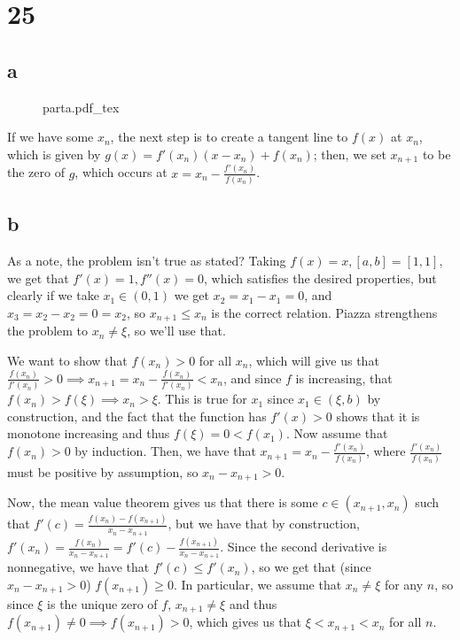 \documentclass[12pt,letterpaper]{article}
\theoremstyle{definition}
\newcommand{\incfig}[1] {%
    {#1.pdf_tex}
}
\begin{document}
\section*{25}


\subsection*{a}

\begin{figure}[H]
  \centering
  \incfig{parta}
\end{figure}

If we have some $x_{n}$, the next step is to create a tangent line to $f(x)$ at $x_{n}$, which is given by $g(x) = f'(x_{n})(x - x_{n}) + f(x_{n})$; then, we set $x_{n+1}$ to be the zero of $g$, which occurs at $x = x_{n} - \frac{f'(x_{n})}{f(x_{n})}$.

\subsection*{b}

As a note, the problem isn't true as stated? Taking $f(x) = x, [a,b] = [1,1]$, we get that $f'(x) = 1, f''(x) = 0$, which satisfies the desired properties, but clearly if we take $x_{1} \in (0, 1)$ we get $x_{2} = x_{1} - x_{1} = 0$, and $x_{3} = x_{2} - x_{2} = 0 = x_{2}$, so $x_{n+1} \leq x_{n}$ is the correct relation. Piazza strengthens the problem to $x_{n} \neq \xi$, so we'll use that.

We want to show that $f(x_{n}) > 0$ for all $x_{n}$, which
will give us that $\frac{f(x_{n})}{f'(x_{n})} > 0 \implies x_{n+1} = x_{n} - \frac{f(x_{n})}{f'(x_{n})} < x_{n}$, and since $f$ is increasing, that $f(x_{n}) > f(\xi) \implies x_{n} > \xi$. This is true for $x_{1}$ since $x_{1} \in (\xi, b)$ by construction, and the fact that the function has $f'(x) > 0$ shows that it is monotone increasing and thus $f(\xi) = 0 < f(x_{1})$. Now assume that $f(x_{n}) > 0$ by induction. Then, we have that $x_{n+1} = x_{n} - \frac{f'(x_{n})}{f(x_{n})}$, where $\frac{f'(x_{n})}{f(x_{n})}$ must be positive by assumption, so $x_{n} - x_{n+1} > 0$.

Now, the mean value theorem gives us that there is some $c \in (x_{n+1}, x_{n})$ such that $f'(c) = \frac{f(x_{n}) - f(x_{n+1})}{x_{n} - x_{n+1}}$, but we have that by construction, $f'(x_{n}) = \frac{f(x_{n})}{x_{n} - x_{n+1}} = f'(c) - \frac{f(x_{n+1})}{x_{n} - x_{n+1}}$. Since the second derivative is nonnegative, we have that $f'(c) \leq f'(x_{n})$, so we get that (since $x_{n} - x_{n+1} > 0$) $f(x_{n+1}) \geq 0$. In particular, we assume that $x_{n} \neq \xi$ for any $n$, so since $\xi$ is the unique zero of $f$, $x_{n+1} \neq \xi$ and thus $f(x_{n+1}) \neq 0 \implies f(x_{n+1}) > 0$, which gives us that $\xi < x_{n+1} < x_{n}$ for all $n$.
\end{document}
